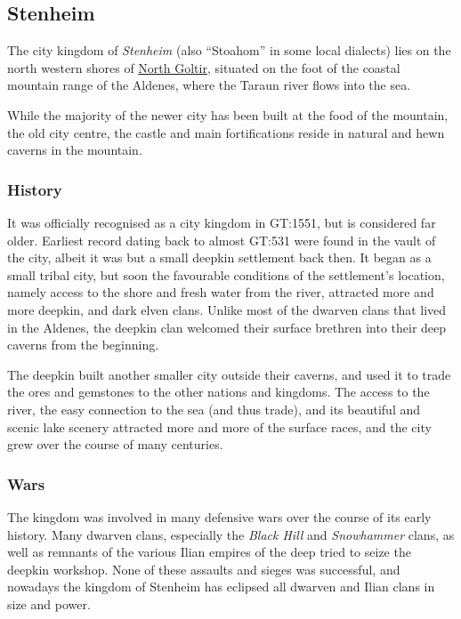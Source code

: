 \subsection{Stenheim}
\label{sec:Stenheim}

The city kingdom of \emph{Stenheim} (also ``Stoahom'' in some local dialects)
lies on the north western shores of \hyperref[sec:Goltir]{North Goltir},
situated on the foot of the coastal mountain range of the Aldenes, where the
Taraun river flows into the sea.

While the majority of the newer city has been built at the food of the
mountain, the old city centre, the castle and main fortifications reside in
natural and hewn caverns in the mountain.

\subsubsection{History}

It was officially recognised as a city kingdom in GT:1551, but is considered
far older. Earliest record dating back to almost GT:531 were found in the
vault of the city, albeit it was but a small deepkin settlement back then. It
began as a small tribal city, but soon the favourable conditions of the
settlement's location, namely access to the shore and fresh water from the
river, attracted more and more deepkin, and dark elven clans. Unlike most of
the dwarven clans that lived in the Aldenes, the deepkin clan welcomed their
surface brethren into their deep caverns from the beginning.

The deepkin built another smaller city outside their caverns, and used it to
trade the ores and gemstones to the other nations and kingdoms. The access to
the river, the easy connection to the sea (and thus trade), and its beautiful
and scenic lake scenery attracted more and more of the surface races, and the
city grew over the course of many centuries.

\subsubsection{Wars}

The kingdom was involved in many defensive wars over the course of its early
history. Many dwarven clans, especially the \emph{Black Hill} and
\emph{Snowhammer} clans, as well as remnants of the various Ilian empires of
the deep tried to seize the deepkin workshop. None of these assaults and sieges
was successful, and nowadays the kingdom of Stenheim has eclipsed all dwarven
and Ilian clans in size and power.

